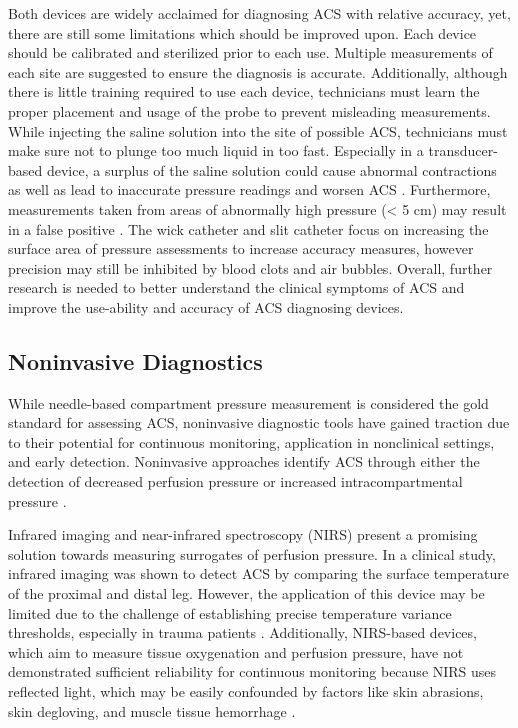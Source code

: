 \documentclass[times, twoside]{zHenriquesLab-StyleBioRxiv}
\begin{document}
Both devices are widely acclaimed for diagnosing ACS with relative accuracy, yet, there are still some limitations which should be improved upon. Each device should be calibrated and sterilized prior to each use. Multiple measurements of each site are suggested to ensure the diagnosis is accurate. Additionally, although there is little training required to use each device, technicians must learn the proper placement and usage of the probe to prevent misleading measurements. While injecting the saline solution into the site of possible ACS, technicians must make sure not to plunge too much liquid in too fast. Especially in a transducer-based device, a surplus of the saline solution could cause abnormal contractions as well as lead to inaccurate pressure readings and worsen ACS \cite{witthauer2020portable}. Furthermore, measurements taken from areas of abnormally high pressure  (< 5 cm) may result in a false positive \cite{hammerberg2023}. The wick catheter and slit catheter focus on increasing the surface area of pressure assessments to increase accuracy measures, however precision may still be inhibited by blood clots and air bubbles. Overall, further research is needed to better understand the clinical symptoms of ACS and improve the use-ability and accuracy of ACS diagnosing devices. 

\subsection*{Noninvasive Diagnostics}
While needle-based compartment pressure measurement is considered the gold standard for assessing ACS, noninvasive diagnostic tools have gained traction due to their potential for continuous monitoring, application in nonclinical settings, and early detection. Noninvasive approaches identify ACS through either the detection of decreased perfusion pressure or increased intracompartmental pressure \cite{Sellei21}. 

Infrared imaging and near-infrared spectroscopy (NIRS) present a promising solution towards measuring surrogates of perfusion pressure. In a clinical study, infrared imaging was shown to detect ACS by comparing the surface temperature of the proximal and distal leg. However, the application of this device may be limited due to the challenge of establishing precise temperature variance thresholds, especially in trauma patients \cite{katz2008infrared}. Additionally, NIRS-based devices, which aim to measure tissue oxygenation and perfusion pressure, have not demonstrated sufficient reliability for continuous monitoring because NIRS uses reflected light, which may be easily confounded by factors like skin abrasions, skin degloving, and muscle tissue hemorrhage \cite{schmidt2018continuous}. 
\end{document}
